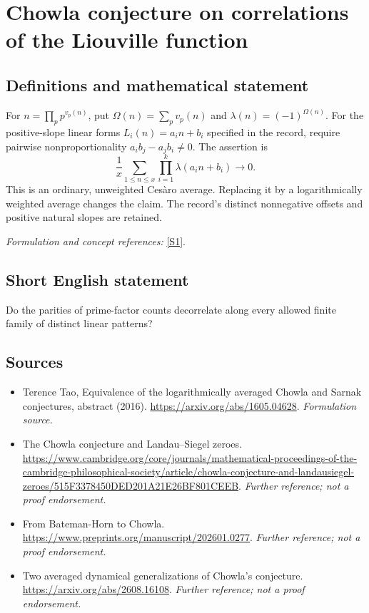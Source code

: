 \documentclass[11pt]{article}
\begin{document}
\section*{\texorpdfstring{Chowla conjecture on correlations of the Liouville function}{Chowla conjecture on correlations of the Liouville function}}\label{statement}
\subsection{Definitions and mathematical statement}
For $n=\prod_p p^{v_p(n)}$, put $\Omega(n)=\sum_pv_p(n)$ and $\lambda(n)=(-1)^{\Omega(n)}$. For the positive-slope linear forms $L_i(n)=a_in+b_i$ specified in the record, require pairwise nonproportionality $a_ib_j-a_jb_i\ne0$. The assertion is
\[
 \frac1x\sum_{1\le n\le x}\prod_{i=1}^k\lambda(a_in+b_i)\longrightarrow0.
\]
This is an ordinary, unweighted Cesàro average. Replacing it by a logarithmically weighted average changes the claim. The record's distinct nonnegative offsets and positive natural slopes are retained.
\par\smallskip\textit{Formulation and concept references:} \href{https://arxiv.org/abs/1605.04628}{[S1]}.

\subsection{Short English statement}
Do the parities of prime-factor counts decorrelate along every allowed finite family of distinct linear patterns?
\subsection{Sources}
\begin{itemize}
\item[S1]Terence Tao, Equivalence of the logarithmically averaged Chowla and Sarnak conjectures, abstract (2016).
\url{https://arxiv.org/abs/1605.04628}.
\textit{Formulation source.}
\item[S2]The Chowla conjecture and Landau–Siegel zeroes.
\url{https://www.cambridge.org/core/journals/mathematical-proceedings-of-the-cambridge-philosophical-society/article/chowla-conjecture-and-landausiegel-zeroes/515F3378450DED201A21E26BF801CEEB}.
\textit{Further reference; not a proof endorsement.}
\item[S3]From Bateman-Horn to Chowla.
\url{https://www.preprints.org/manuscript/202601.0277}.
\textit{Further reference; not a proof endorsement.}
\item[S4]Two averaged dynamical generalizations of Chowla's conjecture.
\url{https://arxiv.org/abs/2608.16108}.
\textit{Further reference; not a proof endorsement.}
\end{itemize}
\end{document}
